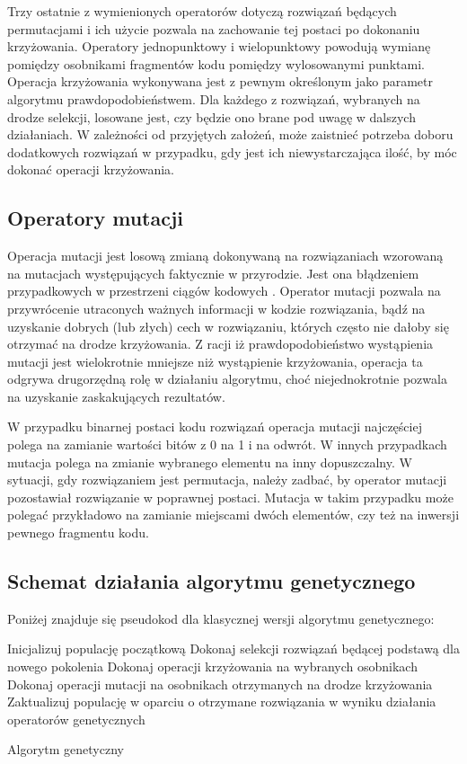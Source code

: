 Trzy ostatnie z wymienionych operatorów dotyczą rozwiązań będących permutacjami i ich użycie pozwala na zachowanie tej postaci po dokonaniu krzyżowania. Operatory jednopunktowy i wielopunktowy powodują wymianę pomiędzy osobnikami fragmentów kodu pomiędzy wylosowanymi punktami. Operacja krzyżowania wykonywana jest z pewnym określonym jako parametr algorytmu prawdopodobieństwem. Dla każdego z rozwiązań, wybranych na drodze selekcji, losowane jest, czy będzie ono brane pod uwagę w dalszych działaniach. W zależności od przyjętych założeń, może zaistnieć potrzeba doboru dodatkowych rozwiązań w przypadku, gdy jest ich niewystarczająca ilość, by móc dokonać operacji krzyżowania.

\subsection{Operatory mutacji}
Operacja mutacji jest losową zmianą dokonywaną na rozwiązaniach wzorowaną na mutacjach występujących faktycznie w przyrodzie. Jest ona błądzeniem przypadkowych w przestrzeni ciągów kodowych \cite{GOLDBERG}. Operator mutacji pozwala na przywrócenie utraconych ważnych informacji w kodzie rozwiązania, bądź na uzyskanie dobrych (lub złych) cech w rozwiązaniu, których często nie dałoby się otrzymać na drodze krzyżowania. Z racji iż prawdopodobieństwo wystąpienia mutacji jest wielokrotnie mniejsze niż wystąpienie krzyżowania, operacja ta odgrywa drugorzędną rolę w działaniu algorytmu, choć niejednokrotnie pozwala na uzyskanie zaskakujących rezultatów.

W przypadku binarnej postaci kodu rozwiązań operacja mutacji najczęściej polega na zamianie wartości bitów z 0 na 1 i na odwrót. W innych przypadkach mutacja polega na zmianie wybranego elementu na inny dopuszczalny. W sytuacji, gdy rozwiązaniem jest permutacja, należy zadbać, by operator mutacji pozostawiał rozwiązanie w poprawnej postaci. Mutacja w takim przypadku może polegać przykładowo na zamianie miejscami dwóch elementów, czy też na inwersji pewnego fragmentu kodu. 

\subsection{Schemat działania algorytmu genetycznego}
Poniżej znajduje się pseudokod dla klasycznej wersji algorytmu genetycznego:
\begin{algorithm}[H]
	Inicjalizuj populację początkową\;
 	{
 		Dokonaj selekcji rozwiązań będącej podstawą dla nowego pokolenia\;
 		Dokonaj operacji krzyżowania na wybranych osobnikach\;
 		Dokonaj operacji mutacji na osobnikach otrzymanych na drodze krzyżowania\;
 		Zaktualizuj populację w oparciu o otrzymane rozwiązania w wyniku działania operatorów genetycznych
 	}
 	\caption{Algorytm genetyczny}
\end{algorithm}
